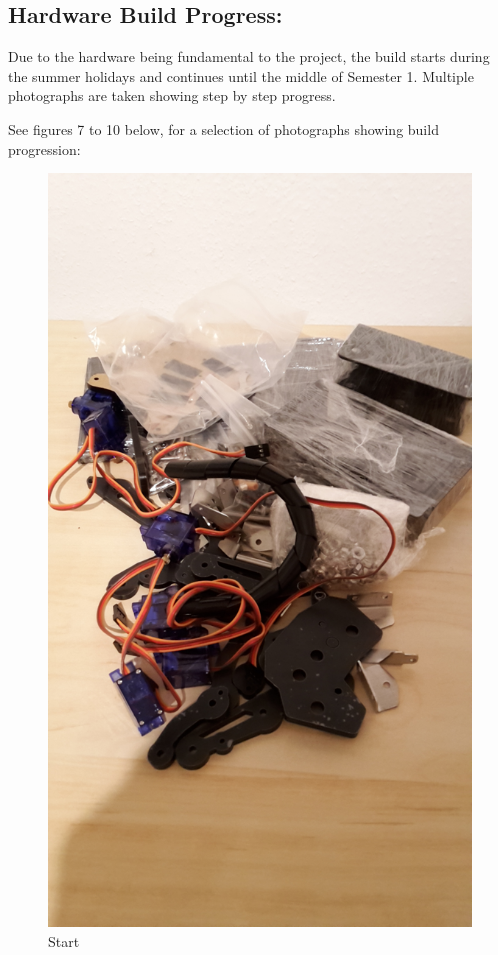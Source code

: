 \documentclass[progress]{cmpreport}
\begin{document}
{{{{{{\subsection{Hardware Build Progress:}

Due to the hardware being fundamental to the project, the build starts during the summer holidays and continues until the middle of Semester 1. Multiple photographs are taken showing step by step progress. 

See figures 7 to 10 below, for a selection of photographs showing build progression: 
\begin{figure}[H]
	\centering
	\begin{minipage}{0.455\textwidth}
		\caption{Start}
		\includegraphics[width=1\textwidth, angle=-90]{photos/start.jpg}

\end{minipage}
\end{figure}}}}}}}
\end{document}
